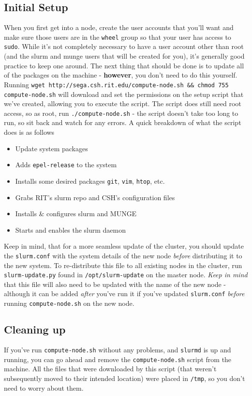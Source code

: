 \documentclass[a4paper]{article}
\begin{document}
\subsection{Initial Setup}

When you first get into a node, create the user accounts that you'll want and make sure those users are in the \texttt{wheel} group so that your user has access to \texttt{sudo}.
While it's not completely necessary to have a user account other than root (and the slurm and munge users that will be created for you), it's generally good practice to keep one around.
The next thing that should be done is to update all of the packages on the machine - \textbf{however}, you don't need to do this yourself. Running \texttt{wget http://sega.csh.rit.edu/compute-node.sh \&\& chmod 755 compute-node.sh} will download and set the permissions on the setup script that we've created, allowing you to execute the script.
The script does still need root access, so as root, run \texttt{./compute-node.sh} - the script doesn't take too long to run, so sit back and watch for any errors.
A quick breakdown of what the script does is as follows

\begin{itemize}[noitemsep]
\item Update system packages
\item Adds \texttt{epel-release} to the system
\item Installs some desired packages \texttt{git}, \texttt{vim}, \texttt{htop}, etc.
\item Grabs RIT's slurm repo and CSH's configuration files
\item Installs \& configures slurm and MUNGE
\item Starts and enables the slurm daemon
\end{itemize}

Keep in mind, that for a more seamless update of the cluster, you should update the \texttt{slurm.conf} with the system details of the new node \textit{before} distributing it to the new system.
To re-distribute this file to all existing nodes in the cluster, run \texttt{slurm-update.py} found in \texttt{/opt/slurm-update} on the master node.
\textit{Keep in mind} that this file will also need to be updated with the name of the new node - although it can be added \textit{after} you've run it if you've updated \texttt{slurm.conf} \textit{before} running \texttt{compute-node.sh} on the new node.

\subsection{Cleaning up}
If you've run \texttt{compute-node.sh} without any problems, and \texttt{slurmd} is up and running, you can go ahead and remove the \texttt{compute-node.sh} script from the machine.
All the files that were downloaded by this script (that weren't subsequently moved to their intended location) were placed in \texttt{/tmp}, so you don't need to worry about them.
\end{document}
